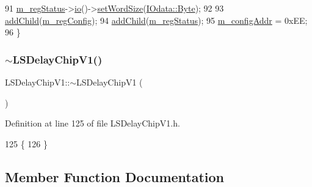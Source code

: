 \begin{DoxyCode}
91         \hyperlink{classLSDelayChipV1_aaf118f103e89a35d2c449e8e3ffe8c20}{m\_regStatus}->\hyperlink{classIOobject_af04fb94137c3d86849f478ac5afab5d1}{io}()->\hyperlink{classIOdata_a20f30a9f4673713616447b1b5e9817d5}{setWordSize}(\hyperlink{classIOdata_a37c53ebf4bf8d866aac8af572962a84ca00156611f08eeb1b5d361de809dafb8e}{IOdata::Byte});
92 
93         \hyperlink{classHierarchy_ad677774ff38fcb257c04a3a10d471fac}{addChild}(\hyperlink{classLSDelayChipV1_afd1cfdcb114549dc1466c77f07d39fe0}{m\_regConfig});
94         \hyperlink{classHierarchy_ad677774ff38fcb257c04a3a10d471fac}{addChild}(\hyperlink{classLSDelayChipV1_aaf118f103e89a35d2c449e8e3ffe8c20}{m\_regStatus});
95         \hyperlink{classLSDelayChipV1_ab49ac38bf9e7a41ccb89c6725cfcac3a}{m\_configAddr} = 0xEE;
96     \}
\end{DoxyCode}
\mbox{\label{classLSDelayChipV1_a86c96f60b9be6f35745536df46919817}} 
\subsubsection{\texorpdfstring{$\sim$\+L\+S\+Delay\+Chip\+V1()}{~LSDelayChipV1()}}
{\footnotesize\ttfamily L\+S\+Delay\+Chip\+V1\+::$\sim$\+L\+S\+Delay\+Chip\+V1 (\begin{DoxyParamCaption}{ }\end{DoxyParamCaption})\hspace{0.3cm}{\ttfamily [inline]}}



Definition at line 125 of file L\+S\+Delay\+Chip\+V1.\+h.


\begin{DoxyCode}
125                   \{
126   \}
\end{DoxyCode}


\subsection{Member Function Documentation}
\mbox{\label{classLSDelayChipV1_a9e04b654e8d6d63efe23fc3b31e15ce6}} 
